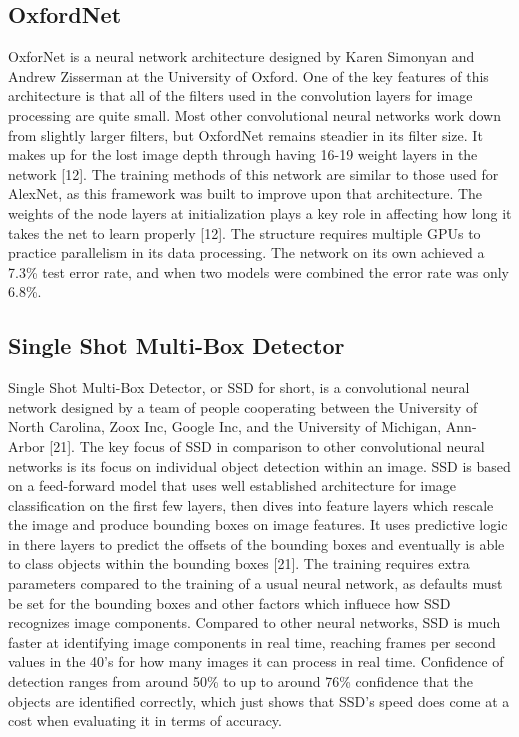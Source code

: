 \documentclass{scrreprt}
\begin{document}
\subsection{OxfordNet}
OxforNet is a neural network architecture designed by Karen Simonyan and Andrew Zisserman at the University of Oxford. 
One of the key features of this architecture is that all of the filters used in the convolution layers for image processing are quite small. 
Most other convolutional neural networks work down from slightly larger filters, but OxfordNet remains steadier in its filter size. 
It makes up for the lost image depth through having 16-19 weight layers in the network [12]. 
The training methods of this network are similar to those used for AlexNet, as this framework was built to improve upon that architecture. 
The weights of the node layers at initialization plays a key role in affecting how long it takes the net to learn properly [12]. 
The structure requires multiple GPUs to practice parallelism in its data processing. 
The network on its own achieved a 7.3\% test error rate, and when two models were combined the error rate was only 6.8\%.

\subsection{Single Shot Multi-Box Detector}
Single Shot Multi-Box Detector, or SSD for short, is a convolutional neural network designed by a team of people cooperating between the University of North Carolina, Zoox Inc, Google Inc, and the University of Michigan, Ann-Arbor [21]. 
The key focus of SSD in comparison to other convolutional neural networks is its focus on individual object detection within an image.
SSD is based on a feed-forward model that uses well established architecture for image classification on the first few layers, then dives into feature layers which rescale the image and produce bounding boxes on image features.
It uses predictive logic in there layers to predict the offsets of the bounding boxes and eventually is able to class objects within the bounding boxes [21].
The training requires extra parameters compared to the training of a usual neural network, as defaults must be set for the bounding boxes and other factors which influece how SSD recognizes image components.
Compared to other neural networks, SSD is much faster at identifying image components in real time, reaching frames per second values in the 40's for how many images it can process in real time. 
Confidence of detection ranges from around 50\% to up to around 76\% confidence that the objects are identified correctly, which just shows that SSD's speed does come at a cost when evaluating it in terms of accuracy.
\end{document}
